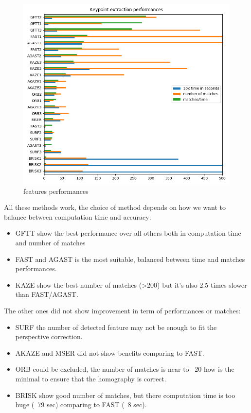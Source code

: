 \documentclass[]{elsarticle}
\begin{document}
	\begin{figure}[!htb]
		\centering
		\includegraphics[width=\linewidth]{../figures/comparaison-keypoint-performances.png}
		\caption{features performances}
		\label{fig:features-performances}
	\end{figure}
	
	\noindent
	All these methods work, the choice of method depends on how we want to balance between computation time and accuracy:
	\begin{itemize}
		\item GFTT show the best performance over all others both in computation time and number of matches
		\item FAST and AGAST is the most suitable, balanced between time and matches performances.
		\item KAZE show the best number of matches (>200) but it's also 2.5 times slower than FAST/AGAST.
	\end{itemize}
	
	\noindent
	The other ones did not show improvement in term of performances or matches:
	\begin{itemize}
		\item SURF the number of detected feature may not be enough to fit the perspective correction.
		\item AKAZE and MSER did not show benefits comparing to FAST.
		\item ORB could be excluded, the number of matches is near to ~20 how is the minimal to ensure that the homography is correct.
		\item BRISK show good number of matches, but there computation time is too huge (~79 sec) comparing to FAST (~8 sec).
	\end{itemize}
	
\end{document}
